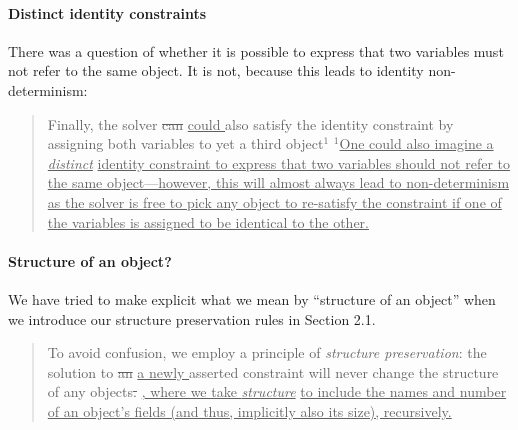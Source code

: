 \documentclass[10pt,twocolumn]{article}
\providecommand{\DIFaddtex}[1]{{\protect\color{BLUE}\uline{#1}}} %
\providecommand{\DIFdeltex}[1]{{\protect\color{gray}\sout{#1}}}                      %
\providecommand{\DIFaddbegin}{} %
\providecommand{\DIFaddend}{} %
\providecommand{\DIFdelbegin}{} %
\providecommand{\DIFdelend}{} %
\providecommand{\DIFadd}[1]{\texorpdfstring{\DIFaddtex{#1}}{#1}} %
\providecommand{\DIFdel}[1]{\texorpdfstring{\DIFdeltex{#1}}{}} %
\begin{document}
\paragraph{Distinct identity constraints}
There was a question of whether it is possible to express that two
variables must not refer to the same object. It is not, because this
leads to identity non-determinism:

\begin{quote}
  Finally, the solver \DIFdelbegin \DIFdel{can }\DIFdelend
  \DIFaddbegin \DIFadd{could }\DIFaddend also satisfy the identity
  constraint by assigning both variables to yet a third
  object\DIFaddbegin \DIFadd{$^1$}
  \baselineskip
  {\footnotesize \DIFadd{$^1$One could also imagine a
    }\emph{\DIFadd{distinct}} \DIFadd{identity constraint to express
      that two variables should not refer to the same
      object---however, this will almost always lead to
      non-determinism as the solver is free to pick any object to
      re-satisfy the constraint if one of the variables is assigned to
      be identical to the other.}} \DIFaddend
\end{quote}

\paragraph{Structure of an object?}
We have tried to make explicit what we mean by ``structure of an
object'' when we introduce our structure preservation rules in
Section 2.1.
\begin{quote}
To avoid confusion, we employ a principle of \emph{structure
  preservation}: the solution to \DIFdelbegin \DIFdel{an }\DIFdelend
\DIFaddbegin \DIFadd{a newly }\DIFaddend asserted constraint will
never change the structure of any objects\DIFdelbegin \DIFdel{.
}\DIFdelend \DIFaddbegin \DIFadd{, where we take }\emph{\DIFadd{structure}} \DIFadd{to
include the names and number of an object's fields (and thus,
implicitly also its size), recursively.}\DIFaddend
\end{quote}
\end{document}
